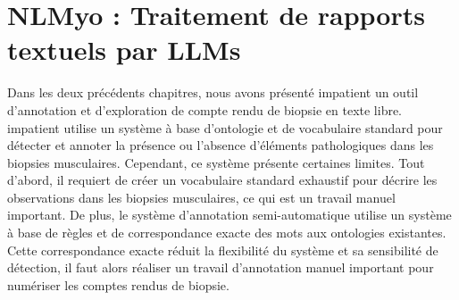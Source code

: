 \chapter{NLMyo : Traitement de rapports textuels par LLMs}\label{chap_nlmyo}

Dans les deux précédents chapitres, nous avons présenté \gls{impatient} un outil d'annotation et d'exploration de compte rendu de biopsie en texte libre. \gls{impatient} utilise un système à base d'ontologie et de vocabulaire standard pour détecter et annoter la présence ou l'absence d'éléments pathologiques dans les biopsies musculaires. Cependant, ce système présente certaines limites. Tout d'abord, il requiert de créer un vocabulaire standard exhaustif pour décrire les observations dans les biopsies musculaires, ce qui est un travail manuel important. De plus, le système d'annotation semi-automatique utilise un système à base de règles et de correspondance exacte des mots aux ontologies existantes. Cette correspondance exacte réduit la flexibilité du système et sa sensibilité de détection, il faut alors réaliser un travail d'annotation manuel important pour numériser les comptes rendus de biopsie. 

